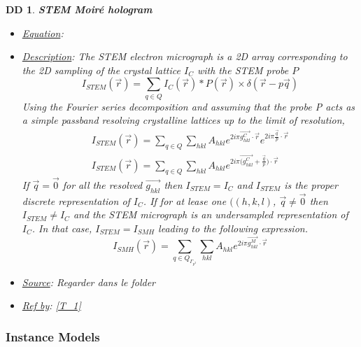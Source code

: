 \documentclass[12pt]{article}
\newtheorem{DD}{DD}
\begin{document}
\begin{DD}
\label{DD_5}
\noindent\colorbox{shadecolorDD}{\normalfont \textbf{STEM Moir{\'e} hologram}}
\normalfont
\begin{itemize}
\item \underline{Equation}:  
\item \underline{Description}: The STEM electron micrograph is a 2D array corresponding to the 2D sampling of the crystal lattice $I_{C}$ with the STEM probe $P$
\begin{equation}
I_{STEM}(\vec{r}) = \sum_{q\in 
Q} I_C(\vec{r}) \ast P(\vec{r}) \times \delta(\vec{r}-p\vec{q}) 
\end{equation}
Using the Fourier series decomposition and assuming that the probe P acts as a simple passband resolving crystalline lattices up to the limit of resolution,
\begin{equation}
\begin{gathered}
I_{STEM}(\vec{r}) = \sum_{q\in 
Q}\sum_{hkl} A_{hkl}e^{2i\pi \overrightarrow{g_{hkl}^{C}} \cdot \overrightarrow{r}} e^{2i\pi\frac{\overrightarrow{q}}{p}\cdot \overrightarrow{r}} \\
I_{STEM}(\vec{r}) = \sum_{q\in 
Q}\sum_{hkl} A_{hkl}e^{2i\pi \overrightarrow{(g_{hkl}^{C}} +\frac{\overrightarrow{q}}{p}) \cdot \overrightarrow{r}}
\end{gathered}
\end{equation}
If $\overrightarrow{q}=\overrightarrow{0}$ for all the resolved $\overrightarrow{g_{hkl}}$ then $I_{STEM} = I_{C}$ and $I_{STEM}$ is the proper discrete representation of $I_{C}$. If for at lease one $((h,k,l)$,  $\overrightarrow{q} \neq \overrightarrow{0}$ then $I_{STEM} \neq  I_{C}$ and the STEM micrograph is an undersampled representation of $I_{C}$. In that case, $I_{STEM} = I_{SMH}$ leading to the following expression.
\begin{equation}
I_{SMH}(\vec{r}) = \sum_{q\in 
Q_{\Gamma_{p^{2}}}}\sum_{hkl} A_{hkl}e^{2i\pi \overrightarrow{g_{hkl}^{M}} \cdot \overrightarrow{r}}
\label{eq:SMH_1}
\end{equation}
\item \underline{Source}: Regarder dans le folder
\item \underline{Ref by}: \cref{T_1}
\end{itemize}
\end{DD}

\subsubsection{Instance Models} \label{sec_instance}    
\end{document}
